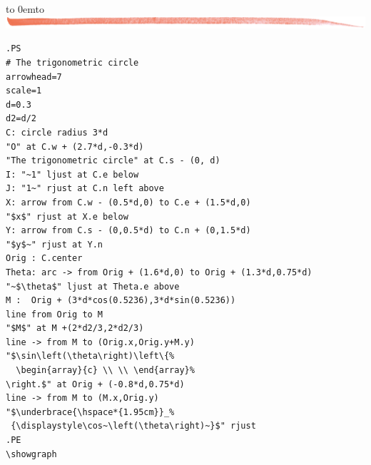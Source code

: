 \documentclass[12pt]{article}
\def\keymenu#1{\textcolor{red}{\underline{#1}}}
\def\advifooter{\vbox to 0em{\vbox to \vsize {\vfill
Press: \keymenu{n}ext page \keymenu{p}revious page
\keymenu{\textvisiblespace} next pause%
} \vss}}
\def\adviheader{\noindent
{\bf\Large \ActiveDVI}\\
\includegraphics[width=\textwidth]{../tex/bar.jpg.eps}}
\let \Newpage \newpage
\def \newpage {\Newpage \advifooter\adviheader}
\def\adviquitfooter{\vbox to 0em{\vbox to \vsize {\vfill
\hfill Press: \keymenu{q} to quit%
} \vss}}
\def\lastpage{\Newpage\adviquitfooter\adviheader}
\begin{document}
\lastpage

\begin{small}
\begin{verbatim}
.PS
# The trigonometric circle
arrowhead=7
scale=1
d=0.3
d2=d/2
C: circle radius 3*d
"O" at C.w + (2.7*d,-0.3*d)
"The trigonometric circle" at C.s - (0, d)
I: "~1" ljust at C.e below
J: "1~" rjust at C.n left above
X: arrow from C.w - (0.5*d,0) to C.e + (1.5*d,0)
"$x$" rjust at X.e below
Y: arrow from C.s - (0,0.5*d) to C.n + (0,1.5*d)
"$y$~" rjust at Y.n
Orig : C.center
Theta: arc -> from Orig + (1.6*d,0) to Orig + (1.3*d,0.75*d)
"~$\theta$" ljust at Theta.e above
M :  Orig + (3*d*cos(0.5236),3*d*sin(0.5236))
line from Orig to M
"$M$" at M +(2*d2/3,2*d2/3)
line -> from M to (Orig.x,Orig.y+M.y)
"$\sin\left(\theta\right)\left\{%
  \begin{array}{c} \\ \\ \end{array}%
\right.$" at Orig + (-0.8*d,0.75*d)
line -> from M to (M.x,Orig.y)
"$\underbrace{\hspace*{1.95cm}}_%
 {\displaystyle\cos~\left(\theta\right)~}$" rjust
.PE
\showgraph
\end{verbatim}
\end{small}
\end{document}
